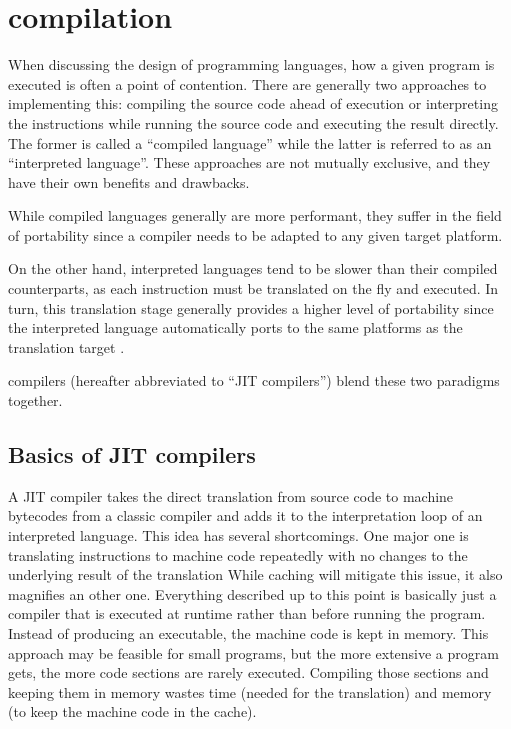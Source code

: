 \chapter{\jit{} compilation}\label{cha:jit}

When discussing the design of programming languages, how a given program is executed is often a point of contention. 
There are generally two approaches to implementing this: compiling the source code ahead of execution or interpreting the instructions while running the source code and executing the result directly.
The former is called a \enquote{compiled language} while the latter is referred to as an \enquote{interpreted language}. 
These approaches are not mutually exclusive, and they have their own benefits and drawbacks. 

While compiled languages generally are more performant, they suffer in the field of portability since a compiler needs to be adapted to any given target platform. 

On the other hand, interpreted languages tend to be slower than their compiled counterparts, as each instruction must be translated on the fly and executed.
In turn, this translation stage generally provides a higher level of portability since the interpreted language automatically ports to the same platforms as the translation target \cite{aycock2003}.

\jit{} compilers (hereafter abbreviated to \enquote{JIT compilers}) blend these two paradigms together.

\section{Basics of JIT compilers}
A JIT compiler takes the direct translation from source code to machine bytecodes from a classic compiler and adds it to the interpretation loop of an interpreted language.
This idea has several shortcomings. One major one is translating instructions to machine code repeatedly with no changes to the underlying result of the translation
While caching will mitigate this issue, it also magnifies an other one. 
Everything described up to this point is basically just a compiler that is executed at runtime rather than before running the program. Instead of producing an executable, the machine code is kept in memory. 
This approach may be feasible for small programs, but the more extensive a program gets, the more code sections are rarely executed.
Compiling those sections and keeping them in memory wastes time (needed for the translation) and memory (to keep the machine code in the cache).

